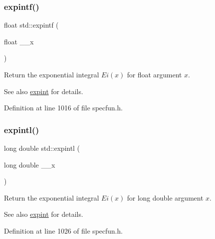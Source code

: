 \subsubsection{\texorpdfstring{expintf()}{expintf()}}
{\footnotesize\ttfamily float std\+::expintf (\begin{DoxyParamCaption}\item[{float}]{\+\_\+\+\_\+x }\end{DoxyParamCaption})\hspace{0.3cm}{\ttfamily [inline]}}

Return the exponential integral $ Ei(x) $ for {\ttfamily float} argument $ x $.

\begin{DoxySeeAlso}{See also}
\hyperlink{group__tr29124__math__spec__func_ga0e9ac717a106ef54184b5f058c451782}{expint} for details. 
\end{DoxySeeAlso}


Definition at line 1016 of file specfun.\+h.

\mbox{\label{group__tr29124__math__spec__func_ga1329130b32328d0666e290ee5931fa4f}} 
\subsubsection{\texorpdfstring{expintl()}{expintl()}}
{\footnotesize\ttfamily long double std\+::expintl (\begin{DoxyParamCaption}\item[{long double}]{\+\_\+\+\_\+x }\end{DoxyParamCaption})\hspace{0.3cm}{\ttfamily [inline]}}

Return the exponential integral $ Ei(x) $ for {\ttfamily long double} argument $ x $.

\begin{DoxySeeAlso}{See also}
\hyperlink{group__tr29124__math__spec__func_ga0e9ac717a106ef54184b5f058c451782}{expint} for details. 
\end{DoxySeeAlso}


Definition at line 1026 of file specfun.\+h.

\mbox{\label{group__tr29124__math__spec__func_ga8bd1626f1e3f7256c4fd13579f881183}} 

